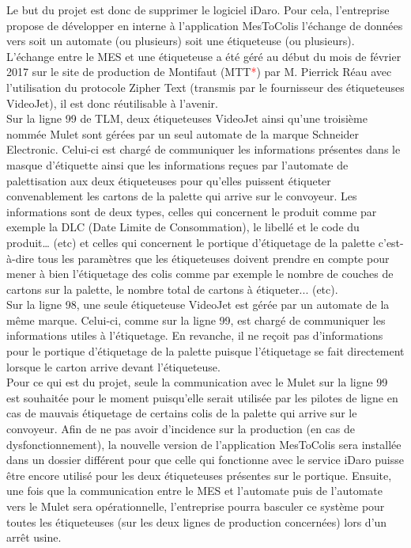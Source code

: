 \documentclass[a4paper,12pt]{extarticle}
\newcommand{\alinea}{\hspace*{0.4cm}}
\begin{document}
	Le but du projet est donc de supprimer le logiciel iDaro. Pour cela, l’entreprise propose de développer en interne à l’application MesToColis l’échange de données vers soit un automate (ou plusieurs) soit une étiqueteuse (ou plusieurs). L’échange entre le MES et une étiqueteuse a été géré au début du mois de février 2017 sur le site de production de Montifaut (MTT\textcolor{red}{*}) par M. Pierrick Réau avec l’utilisation du protocole Zipher Text (transmis par le fournisseur des étiqueteuses VideoJet), il est donc réutilisable à l’avenir.\\
	Sur la ligne 99 de TLM, deux étiqueteuses VideoJet ainsi qu’une troisième nommée Mulet sont gérées par un seul automate de la marque Schneider Electronic. Celui-ci est chargé de communiquer les informations présentes dans le masque d’étiquette ainsi que les informations reçues par l’automate de palettisation aux deux étiqueteuses pour qu’elles puissent étiqueter convenablement les cartons de la palette qui arrive sur le convoyeur. Les informations sont de deux types, celles qui concernent le produit comme par exemple la DLC (Date Limite de Consommation), le libellé et le code du produit… (etc) et celles qui concernent le portique d'étiquetage de la palette c’est-à-dire tous les paramètres que les étiqueteuses doivent prendre en compte pour mener à bien l’étiquetage des colis comme par exemple le nombre de couches de cartons sur la palette, le nombre total de cartons à étiqueter... (etc).\\
	Sur la ligne 98, une seule étiqueteuse VideoJet est gérée par un automate de la même marque. Celui-ci, comme sur la ligne 99, est chargé de communiquer les informations utiles à l’étiquetage. En revanche, il ne reçoit pas d’informations pour le portique d'étiquetage de la palette puisque l’étiquetage se fait directement lorsque le carton arrive devant l’étiqueteuse.\\
\alinea
Pour ce qui est du projet, seule la communication avec le Mulet sur la ligne 99 est souhaitée pour le moment puisqu’elle serait utilisée par les pilotes de ligne en cas de mauvais étiquetage de certains colis de la palette qui arrive sur le convoyeur. Afin de ne pas avoir d’incidence sur la production (en cas de dysfonctionnement), la nouvelle version de l’application MesToColis sera installée dans un dossier différent pour que celle qui fonctionne avec le service iDaro puisse être encore utilisé pour les deux étiqueteuses présentes sur le portique. Ensuite, une fois que la communication entre le MES et l’automate puis de l’automate vers le Mulet sera opérationnelle, l’entreprise pourra basculer ce système pour toutes les étiqueteuses (sur les deux lignes de production concernées) lors d’un arrêt usine.\\
\end{document}
